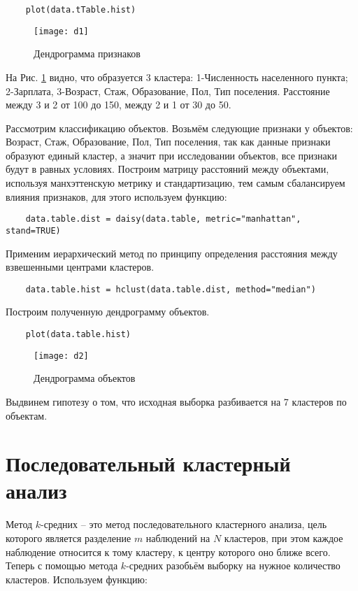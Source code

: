 \documentclass[12pt,a4paper,titlepage]{article}
\begin{document}
  \begin{lstlisting}
    plot(data.tTable.hist)
  \end{lstlisting}

  \begin{figure}
    \texttt{[image: d1]}
    \caption{Дендрограмма признаков}
    \label{fig:dend1}
  \end{figure}
  На Рис. \ref{fig:dend1} видно, что образуется 3 кластера: 1-Численность населенного пункта; 2-Зарплата, 3-Возраст, Стаж, Образование, Пол, Тип поселения. Расстояние между 3 и 2 от 100 до 150, между 2 и 1 от 30 до 50.

  Рассмотрим классификацию объектов.
  Возьмём следующие признаки у объектов: Возраст, Стаж, Образование, Пол, Тип поселения, так как данные признаки образуют единый кластер, а значит при исследовании объектов, все признаки будут в равных условиях.
  Построим матрицу расстояний между объектами, используя манхэттенскую метрику и стандартизацию, тем самым сбалансируем влияния признаков, для этого используем функцию:

  \begin{lstlisting}
    data.table.dist = daisy(data.table, metric="manhattan", stand=TRUE)
  \end{lstlisting}
  Применим иерархический метод по принципу определения расстояния между взвешенными центрами кластеров.

  \begin{lstlisting}
    data.table.hist = hclust(data.table.dist, method="median")
  \end{lstlisting}

  Построим полученную дендрограмму объектов.
  
  \begin{lstlisting}
    plot(data.table.hist)
  \end{lstlisting}

  \begin{figure}
    \texttt{[image: d2]}
    \caption{Дендрограмма объектов}
    \label{fig:dend2}
  \end{figure}
  Выдвинем гипотезу о том, что исходная выборка разбивается на 7 кластеров по объектам.
  \clearpage

\section{Последовательный кластерный анализ}
  Метод $k$-средних – это метод последовательного кластерного анализа, цель которого является разделение $m$ наблюдений на $N$ кластеров, при этом каждое наблюдение относится к тому кластеру, к центру которого оно ближе всего. 
  Теперь с помощью метода $k$-средних разобьём выборку на нужное количество кластеров. Используем функцию:
\end{document}
